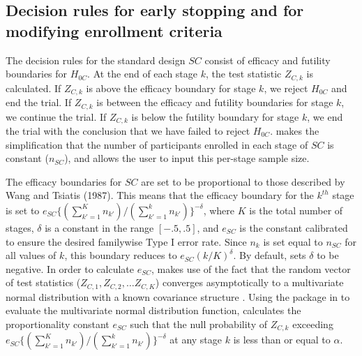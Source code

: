 \documentclass[article]{jss}
\begin{document}



\subsection{Decision rules for early stopping and for modifying enrollment criteria}
\label{sub:decisionRules}


The decision rules for the standard design $SC$ consist of efficacy and futility boundaries for $H_{0C}$. At the end of each stage $k$,  the test statistic $Z_{C,k}$ is calculated. If $Z_{C,k}$ is above the efficacy boundary for stage $k$, we reject $H_{0C}$ and end the trial. If $Z_{C,k}$ is between the efficacy and futility boundaries for stage $k$, we continue the trial. If $Z_{C,k}$ is below the futility boundary for stage $k$, we end the trial with the conclusion that we have failed to reject $H_{0C}$.  makes the simplification that the number of participants enrolled in each stage of $SC$ is constant ($n_{SC}$), and allows the user to input this per-stage sample size.

The efficacy boundaries for $SC$ are set to be proportional to those described by Wang and Tsiatis (1987). This means that the efficacy boundary for the $k^{th}$ stage is set to $e_{SC}\{(\sum_{k'=1}^{K} n_{k'})/(\sum_{k'=1}^{k}n_{k'})\}^{-δ}$, where $K$ is the total number of stages, $δ$ is a constant in the range $[-.5,.5]$, and $e_{SC}$ is the constant calibrated to ensure the desired familywise Type I error rate. Since $n_{k}$ is set equal to $n_{SC}$ for all values of $k$, this boundary reduces to $e_{SC}(k/K)^\delta$. By default,  sets $\delta$ to be negative. In order to calculate $e_{SC}$,  makes use of the fact that the random vector of test statistics ($Z_{C,1},Z_{C,2},…Z_{C,K}$) converges asymptotically to a multivariate normal distribution with a known covariance structure \citep{JennisonTurnbullBook}. %
Using the  package \citep{mvtnorm} in  to evaluate the multivariate normal distribution function,  calculates the proportionality constant $e_{SC}$ such that the null probability of $Z_{C,k}$ exceeding $e_{SC}\{(\sum_{k'=1}^{K} n_{k'})/(\sum_{k'=1}^{k}n_{k'})\}^{-δ}$ at any stage $k$ is less than or equal to $α$.
\end{document}
